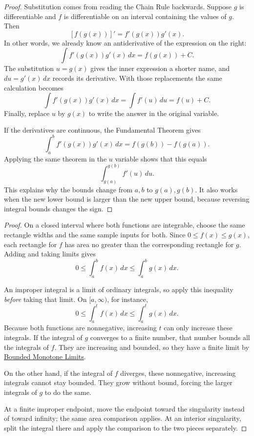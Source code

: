 
\begin{proof}
Substitution comes from reading the Chain Rule backwards. Suppose
$g$ is differentiable and $f$ is differentiable on an interval containing
the values of $g$. Then
$$[f(g(x))]'=f'(g(x))g'(x).$$
In other words, we already know an antiderivative of the expression on
the right:
$$\int f'(g(x))g'(x)\,dx=f(g(x))+C.$$
The substitution $u=g(x)$ gives the inner expression a shorter name,
and $du=g'(x)\,dx$ records its derivative. With those replacements the
same calculation becomes
$$\int f'(g(x))g'(x)\,dx=\int f'(u)\,du=f(u)+C.$$
Finally, replace $u$ by $g(x)$ to write the answer in the original variable.

If the derivatives are continuous, the Fundamental Theorem gives
$$\int_a^b f'(g(x))g'(x)\,dx=f(g(b))-f(g(a)).$$
Applying the same theorem in the $u$ variable shows that this equals
$$\int_{g(a)}^{g(b)}f'(u)\,du.$$
This explains why the bounds change from $a,b$ to $g(a),g(b)$. It also
works when the new lower bound is larger than the new upper bound,
because reversing integral bounds changes the sign.
\end{proof}



\begin{proof}
On a closed interval where both functions are integrable, choose
the same rectangle widths and the same sample inputs for both. Since
$0\leq f(x)\leq g(x)$, each rectangle for $f$ has area no greater than
the corresponding rectangle for $g$. Adding and taking limits gives
$$0\leq\int_a^b f(x)\,dx\leq\int_a^b g(x)\,dx.$$

An improper integral is a limit of ordinary integrals, so apply this
inequality \textit{before} taking that limit. On $[a,\infty)$, for instance,
$$0\leq\int_a^t f(x)\,dx\leq\int_a^t g(x)\,dx.$$
Because both functions are nonnegative, increasing $t$ can only increase
these integrals. If the integral of $g$ converges to a finite number,
that number bounds all the integrals of $f$. They are increasing and
bounded, so they have a finite limit by
\hyperref[sec:bounded-monotone-limits]{Bounded Monotone Limits}.

On the other hand, if the integral of $f$ diverges, these nonnegative,
increasing integrals cannot stay bounded. They grow without bound,
forcing the larger integrals of $g$ to do the same.

At a finite improper endpoint, move the endpoint toward the singularity
instead of toward infinity; the same area comparison applies. At an
interior singularity, split the integral there and apply the comparison
to the two pieces separately.
\end{proof}


